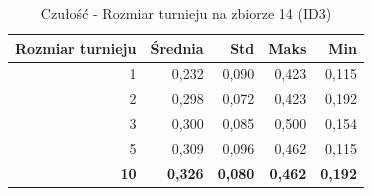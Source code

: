 \begin{table}[htbp]
\centering
\small
\setlength{\tabcolsep}{6pt}
\renewcommand{\arraystretch}{1.2}
\caption{Czułość - Rozmiar turnieju na zbiorze 14 (ID3)}
\label{tab:ID3_tournament_size_14_recall}
\begin{tabular}{r|r|r|r|r}
\toprule
Rozmiar turnieju & Średnia & Std & Maks & Min \\
\hline
1 & 0,232 & 0,090 & 0,423 & 0,115 \\
2 & 0,298 & 0,072 & 0,423 & 0,192 \\
3 & 0,300 & 0,085 & 0,500 & 0,154 \\
5 & 0,309 & 0,096 & 0,462 & 0,115 \\
\textbf{10} & \textbf{0,326} & \textbf{0,080} & \textbf{0,462} & \textbf{0,192} \\
\bottomrule
\end{tabular}
\end{table}